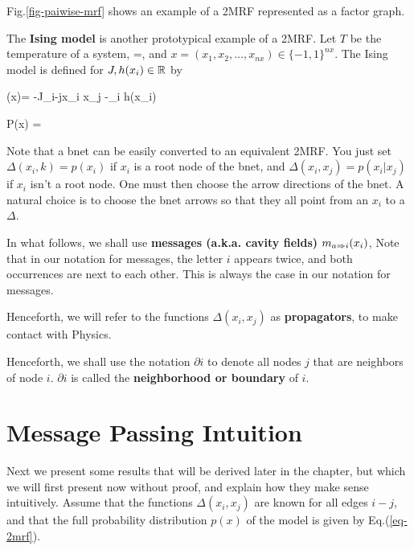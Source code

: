 Fig.\ref{fig-paiwise-mrf}
shows an example
of a 2MRF
represented as a
factor graph.

The {\bf Ising model} is
another prototypical
example of a 2MRF.
Let $T$ be the temperature
of a system,
\beq
\theta=\;,
\eeq
and
$x= (x_1, x_2, \ldots, x_{nx})
\in\{-1, 1\}^{nx}$.
The Ising model
is defined
for $J,h(x_i)\in { \mathbb{R}}$ by

\beq
\eps(x)= -J\sum_{i-j}x_i x_j -\sum_i h(x_i)
\eeq

\beq
P(x) =
\eeq


Note that a bnet can
be easily converted to an
equivalent
2MRF.
You just
set $\Delta(x_i, k)=p(x_i)$
if $x_i$ is a root node
of the bnet,
and $\Delta(x_i, x_j)=p(x_i|x_j) $
if $x_i$ isn't a root node.
One
must then choose
the arrow directions
of the bnet.
A natural choice
is to choose the
bnet arrows so
that they all point from
an $x_i$ to a $\Delta$.



In what follows,
we shall use
{\bf messages (a.k.a. cavity fields)}
 $m_{a\Rightarrow i}(x_i)$,
Note
that in our
notation
for messages, the letter $i$
appears twice,
and both occurrences
are next to each other.
This is always the case in
our notation for messages.

Henceforth, we will
refer to the functions
$\Delta(x_i, x_j)$
as {\bf propagators},
to make contact with
Physics.

Henceforth,
we shall use the notation
$\partial i$
to denote all nodes
$j$ that
are neighbors of node $i$.
$\partial i$ is called
the {\bf neighborhood or boundary} of $i$.


\section{Message Passing Intuition}
Next we present
some results that will
be derived later in the chapter,
but which we will first
present  now without proof,
and explain how they
make sense intuitively.
Assume that the functions $\Delta(x_i, x_j)$
are known
for all edges $i-j$, and that
the full
probability distribution $p(x)$
of the model
is given by
Eq.(\ref{eq-2mrf}).

